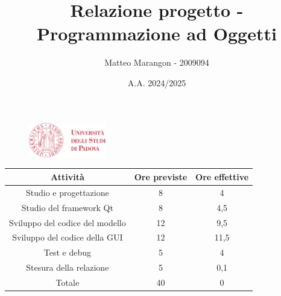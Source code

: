 \documentclass[10pt]{article}
\title{Relazione progetto - Programmazione ad Oggetti}
\author{Matteo Marangon - 2009094}
\date{A.A. 2024/2025}
\begin{document}
\begin{figure}
    \centering
    \includegraphics[width=0.3\textwidth]{./unipdlogo.png}
\end{figure}
\maketitle

\newpage

\tableofcontents
\newpage

\begin{center}
    \begin{tabular}{| c | c | c |} \hline
    Attività & Ore previste & Ore effettive \\\hline
    Studio e progettazione & 8 & 4 \\
    Studio del framework Qt & 8 & 4,5 \\
    Sviluppo del codice del modello & 12 & 9,5 \\
    Sviluppo del codice della GUI & 12 & 11,5 \\
    Test e debug & 5 & 4 \\
    Stesura della relazione & 5 & 0,1 \\\hline
    Totale & 40 & 0 \\\hline
    \end{tabular}
\end{center}
\end{document}
